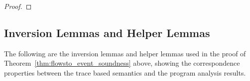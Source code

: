 \begin{proof}

%
\end{proof}

\subsection{Inversion Lemmas and Helper Lemmas}
The following are the inversion lemmas and helper lemmas used in the proof of Theorem~\ref{thm:flowsto_event_soundness} above,
showing the correspondence properties between the trace based semantics and the program analysis results.
